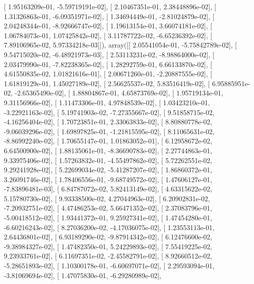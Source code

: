 \documentclass{article}
\begin{document}
       [  1.95163209e-01,  -5.59719191e-02],
       [  2.10467351e-01,   2.38448896e-02],
       [  1.31326863e-01,  -6.09351971e-02],
       [  1.34694449e-01,  -2.81024879e-02],
       [  2.04248344e-01,  -8.92666747e-02],
       [  1.19613154e-01,   3.66074181e-02],
       [  1.06784073e-01,   1.07425842e-02],
       [  3.11787722e-02,  -6.65236392e-02],
       [  7.89106965e-02,   5.97334218e-03]]), array([[  2.05541054e-01,  -5.75842789e-02],
       [  9.54715020e-02,  -6.48921973e-03],
       [  2.53113231e-02,  -8.98864000e-02],
       [  2.03479990e-01,  -7.82238365e-02],
       [  1.28292759e-01,   6.66133870e-02],
       [  4.61550835e-02,   1.01821616e-01],
       [  2.00671260e-01,  -2.20887555e-02],
       [  1.61819129e-01,   1.45027189e-02],
       [  2.56625537e-02,   5.83516419e-02],
       [  6.95885951e-02,  -2.65365490e-02],
       [  1.88804867e-01,   4.65873769e-02],
       [  1.95719134e-01,   9.31156966e-02],
       [  1.11473306e-01,   4.97848539e-02],
       [  1.03423210e-01,  -3.22921163e-02],
       [  5.19741903e-02,  -7.27355667e-02],
       [  9.51858715e-02,  -4.16256404e-02],
       [  1.70723851e-01,   2.33063833e-02],
       [  8.80880778e-02,  -9.06039296e-02],
       [  1.69897825e-01,  -1.21815595e-02],
       [  8.11065631e-02,  -8.86992240e-02],
       [  1.70655147e-01,   1.01863052e-01],
       [  6.12958672e-02,   6.64500900e-02],
       [  1.88135061e-01,  -8.36690783e-02],
       [  2.27744863e-01,   9.33975406e-02],
       [  1.57263832e-01,  -4.55497862e-02],
       [  5.72262551e-02,   9.29241928e-02],
       [  5.22699034e-02,  -5.41287207e-02],
       [  1.86860372e-01,   3.26091746e-02],
       [  1.78406556e-01,  -9.68749572e-02],
       [  1.47606127e-01,  -7.83896481e-03],
       [  6.84787072e-02,   5.82413149e-02],
       [  4.63315622e-02,   5.15780730e-02],
       [  9.93338500e-02,   4.27044963e-02],
       [  6.20902831e-02,  -7.20932751e-02],
       [  4.47486253e-02,   5.66471352e-02],
       [  2.37083796e-01,  -5.00418512e-02],
       [  1.93441372e-01,   9.25927341e-02],
       [  1.47454280e-01,  -6.60216243e-02],
       [  8.27036200e-02,  -4.17036075e-02],
       [  1.23553113e-01,   2.64436801e-02],
       [  6.93189290e-02,  -9.87914342e-02],
       [  6.12476600e-02,  -9.38984327e-02],
       [  1.47482350e-01,   5.24229893e-02],
       [  7.55419225e-02,   9.23933761e-02],
       [  6.11697351e-02,  -2.45582791e-02],
       [  8.92660512e-02,  -5.28651893e-02],
       [  1.10300178e-01,  -6.60697071e-02],
       [  2.29593094e-01,  -3.81069694e-02],
       [  1.47075830e-01,  -6.29280989e-02],
\end{document}
